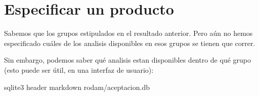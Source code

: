\documentclass[letterpaper,10pt,spanish]{sphinxmanual}
\begin{document}
\begin{sphinxVerbatim}[commandchars=\\\{\}]
      
                                   
                                   
                                   
                                   
                                   
\end{sphinxVerbatim}


\section{Especificar un producto}
\label{\detokenize{requerimientos/laboratorio_aceptacion:especificar-un-producto}}
Sabemos que   los grupos estipulados en el
resultado anterior. Pero aún no hemos especificado cuáles de los
analisis disponibles en esos grupos se tienen que correr.

Sin embargo, podemos saber qué analisis estan disponibles dentro de qué
grupo (esto puede ser útil, en una interfaz de usuario):

\begin{sphinxVerbatim}[commandchars=\\\{\}]
sqlite3 \PYGZhy{}header \PYGZhy{}markdown rodam/aceptacion.db 
\end{sphinxVerbatim}
\end{document}
